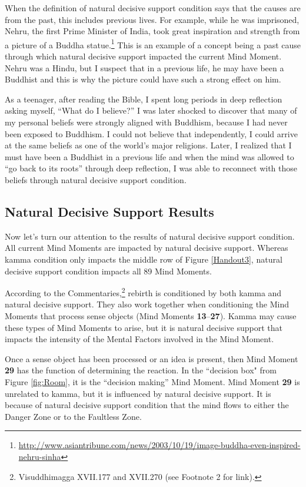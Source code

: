 When the definition of natural decisive support condition says that the causes are from the past, this includes previous lives. For example, while he was imprisoned, Nehru, the first Prime Minister of India, took great inspiration and strength from a picture of a Buddha statue.\footnote{\url{http://www.asiantribune.com/news/2003/10/19/image-buddha-even-inspired-nehru-sinha}} This is an example of a concept being a past cause through which natural decisive support impacted the current Mind Moment. Nehru was a Hindu, but I suspect that in a previous life, he may have been a Buddhist and this is why the picture could have such a strong effect on him. 

\pagebreak

As a teenager, after reading the Bible, I spent long periods in deep reflection asking myself, “What do I believe?” I was later shocked to discover that many of my personal beliefs were strongly aligned with Buddhism, because I had never been exposed to Buddhism. I could not believe that independently, I could arrive at the same beliefs as one of the world’s major religions. Later, I realized that I must have been a Buddhist in a previous life and when the mind was allowed to “go back to its roots” through deep reflection, I was able to reconnect with those beliefs through natural decisive support condition.

\subsection*{Natural Decisive Support Results}

Now let’s turn our attention to the results of natural decisive support condition. All current Mind Moments are impacted by natural decisive support. Whereas kamma condition only impacts the middle row of Figure \ref{Handout3}, natural decisive support condition impacts all 89 Mind Moments.

According to the Commentaries,\footnote{Visuddhimagga XVII.177 and XVII.270 (see Footnote 2 for link).} rebirth is conditioned by both kamma and natural decisive support. They also work together when conditioning the Mind Moments that process sense objects (Mind Moments \textbf{13}--\textbf{27}). Kamma may cause these types of Mind Moments to arise, but it is natural decisive support that impacts the intensity of the Mental Factors involved in the Mind Moment.

Once a sense object has been processed or an idea is present, then Mind Moment \textbf{29} has the function of determining the reaction. In the ``decision box" from Figure \ref{fig:Room}, it is the “decision making” Mind Moment. Mind Moment \textbf{29} is unrelated to kamma, but it is influenced by natural decisive support. It is because of natural decisive support condition that the mind flows to either the Danger Zone or to the Faultless Zone.

